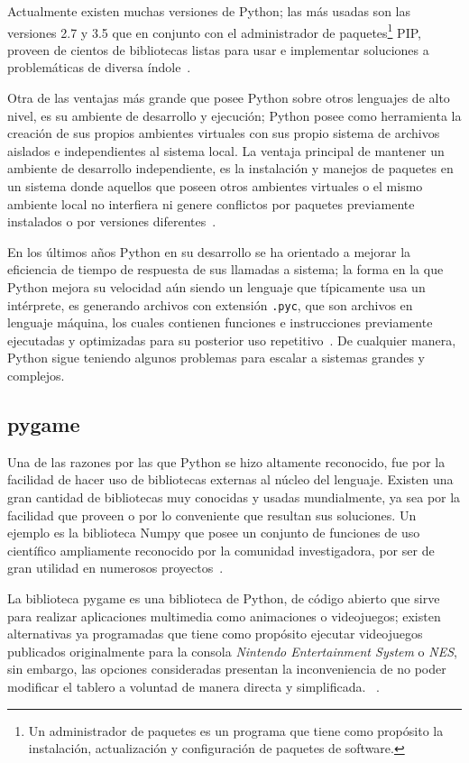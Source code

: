 Actualmente existen muchas versiones de Python; las más usadas son 
las versiones 2.7 y 3.5 que en conjunto con el administrador de
paquetes\footnote{Un administrador de paquetes es un programa que tiene como
propósito la instalación, actualización y configuración de paquetes de software.}
PIP, proveen de cientos de bibliotecas listas para usar e implementar soluciones
a problemáticas de diversa índole~\cite{python}.

Otra de las ventajas más grande que posee Python sobre otros lenguajes de alto
nivel, es su ambiente de desarrollo
y ejecución; Python posee como herramienta la creación de sus propios ambientes
virtuales con sus propio sistema de archivos aislados e independientes al
sistema local. La ventaja principal de mantener un ambiente de desarrollo
independiente, es la instalación y manejos de paquetes en un sistema donde
aquellos que poseen otros ambientes virtuales o el mismo ambiente
local no interfiera ni genere conflictos por paquetes previamente instalados o
por versiones diferentes~\cite{venv}. %

En los últimos años Python en su desarrollo se ha orientado a mejorar la
eficiencia de tiempo de respuesta de sus llamadas a sistema; la forma en la que
Python mejora su velocidad aún siendo un lenguaje que típicamente usa un
intérprete, es generando archivos con extensión \texttt{.pyc}, que son archivos
en lenguaje máquina, los cuales contienen funciones e instrucciones previamente
ejecutadas y optimizadas para su posterior uso repetitivo~\cite{python}. De
cualquier manera, Python sigue teniendo algunos problemas para escalar a
sistemas grandes y complejos.


\subsection{pygame}

Una de las razones por las que Python se hizo altamente reconocido, fue por la
facilidad de hacer uso de bibliotecas externas al núcleo del lenguaje. Existen
una gran cantidad de bibliotecas muy conocidas y usadas mundialmente,
ya sea por la facilidad que proveen o por lo conveniente que resultan sus
soluciones. Un ejemplo es la
biblioteca Numpy que posee un conjunto de funciones de uso científico ampliamente
reconocido por la comunidad investigadora, por ser de gran utilidad en numerosos 
proyectos~\cite{numpy}.

La biblioteca pygame es una biblioteca de Python, de código abierto que sirve para realizar 
aplicaciones multimedia como animaciones o videojuegos; existen 
alternativas ya programadas que tiene como propósito ejecutar videojuegos 
publicados originalmente para la consola \textit{Nintendo Entertainment System} 
o \textit{NES}, sin embargo, las opciones consideradas presentan la inconveniencia de no poder 
modificar el tablero a voluntad de manera directa y simplificada.~\cite{gym-tetris} \cite{nespy}.

